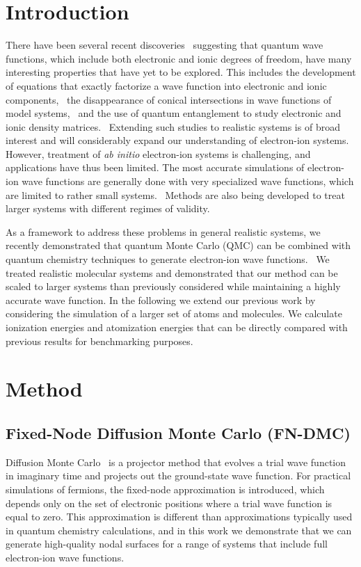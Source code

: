 \section{Introduction}
There have been several recent discoveries~\cite{Tubman_ECG,cederbaum1,gross2014,boent,Martinez_Review} suggesting that quantum wave functions, which include both electronic and ionic degrees of freedom, have many interesting properties that have yet to be explored.  This includes the development of equations that exactly factorize a wave function into electronic and ionic components,~\cite{cederbaum1,cederbaum12} the disappearance of conical intersections in wave functions of model systems,~\cite{gross2014} and the use of quantum entanglement to study electronic and ionic density matrices.~\cite{boent} Extending such studies to realistic systems is of broad interest and will considerably expand our understanding of electron-ion systems. However, treatment of \textit{ab initio} electron-ion systems is challenging, and applications have thus been limited. The most accurate simulations of electron-ion wave functions are generally done with very specialized wave functions, which are limited to rather small systems.~\cite{mitroy2013} Methods are also being developed to treat larger systems with different regimes of validity.~\cite{Sharon_NEO-HF,Sharon_XCNEO-HF1,Sharon_XCNEO-HF2,Sharon_XCNEO-HF,Kurt_XCNEO-HF,Kurt_XCNEO-HF1,Sharon_NEO-DFT,Sharon_NEO-DFT2,Sharon_NEO-DFT3,Gross_NEO-DFT,Gross_NEO-DFT1,Ilkka_Path,Ilkka_Path1,Ilkka_Path2}

As a framework to address these problems in general realistic systems, we recently demonstrated that quantum Monte Carlo (QMC) can be combined with quantum chemistry techniques to generate electron-ion wave functions.~\cite{Tubman_ECG} We treated realistic molecular systems and demonstrated that our method can be scaled to larger systems than previously considered while maintaining a highly accurate wave function. In the following we extend our previous work by considering the simulation of a larger set of atoms and molecules.  We calculate ionization energies and atomization energies that can be directly compared with previous results for benchmarking purposes.

\section{Method}
\subsection{Fixed-Node Diffusion Monte Carlo (FN-DMC)}
Diffusion Monte Carlo~\cite{Anderson_DMC,lester1,Stuart_Review,Needs_Review,Needs_Old_Review,QMC_Review} is a projector method that evolves a trial wave function in imaginary time and projects out the ground-state wave function. For practical simulations of fermions, the fixed-node approximation is introduced, which depends only on the set of electronic positions where a trial wave function is equal to zero.  This approximation is different than approximations typically used in quantum chemistry calculations, and in this work we demonstrate that we can generate high-quality nodal surfaces for a range of systems that include full electron-ion wave functions. 

